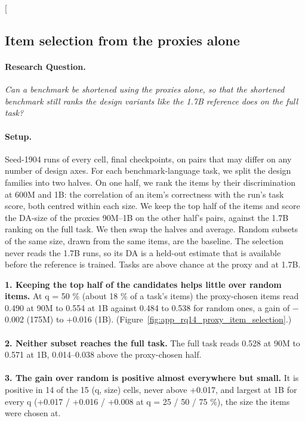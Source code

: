 \clearpage
\twocolumn[{%
\subsection{Item selection from the proxies alone}
\label{app:rq14_proxy_item_selection}

\noindent\begin{minipage}[t]{0.485\textwidth}
\vspace{0pt}
\paragraph{Research Question.} \emph{Can a benchmark be shortened using the proxies alone, so that the shortened benchmark still ranks the design variants like the 1.7B reference does on the full task?}

\paragraph{Setup.} Seed-1904 runs of every cell, final checkpoints, on pairs that may differ on any number of design axes. For each benchmark-language task, we split the design families into two halves. On one half, we rank the items by their discrimination at 600M and 1B: the correlation of an item's correctness with the run's task score, both centred within each size. We keep the top half of the items and score the DA-size of the proxies 90M--1B on the other half's pairs, against the 1.7B ranking on the full task. We then swap the halves and average. Random subsets of the same size, drawn from the same items, are the baseline. The selection never reads the 1.7B runs, so its DA is a held-out estimate that is available before the reference is trained. Tasks are above chance at the proxy and at 1.7B.
\end{minipage}\hfill
\begin{minipage}[t]{0.485\textwidth}
\vspace{0pt}
\begin{rqfinding}
\textbf{1. Keeping the top half of the candidates helps little over random items.} At q = 50 \% (about 18 \% of a task's items) the proxy-chosen items read 0.490 at 90M to 0.554 at 1B against 0.484 to 0.538 for random ones, a gain of $-$0.002 (175M) to +0.016 (1B). (Figure~\ref{fig:app_rq14_proxy_item_selection}.)
\\
\\
\textbf{2. Neither subset reaches the full task.} The full task reads 0.528 at 90M to 0.571 at 1B, 0.014--0.038 above the proxy-chosen half.
\\
\\
\textbf{3. The gain over random is positive almost everywhere but small.} It is positive in 14 of the 15 (q, size) cells, never above +0.017, and largest at 1B for every q (+0.017 / +0.016 / +0.008 at q = 25 / 50 / 75 \%), the size the items were chosen at.
\end{rqfinding}
\end{minipage}

}
